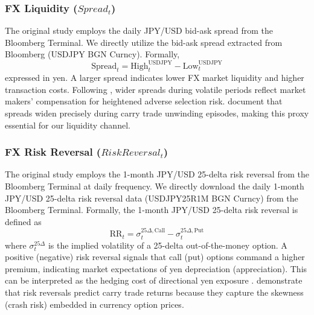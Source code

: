 \documentclass[12pt]{article}
\begin{document}
\subsubsection{FX Liquidity ($Spread_t$)}
{} The original study \parencite{guyot2026risk} employs the daily JPY/USD bid-ask spread from the Bloomberg Terminal. We directly utilize the bid-ask spread extracted from Bloomberg (USDJPY BGN Curncy). Formally, \begin{equation} \text{Spread}_t = \text{High}_t^{\text{USDJPY}} - \text{Low}_t^{\text{USDJPY}} \end{equation} expressed in yen. A larger spread indicates lower FX market liquidity and higher transaction costs. Following \textcite{bollerslev1994bid}, wider spreads during volatile periods reflect market makers' compensation for heightened adverse selection risk. \textcite{gagnon2007carry} document that spreads widen precisely during carry trade unwinding episodes, making this proxy essential for our liquidity channel.

\subsubsection{FX Risk Reversal ($RiskReversal_t$)}
{} The original study \parencite{guyot2026risk} employs the 1-month JPY/USD 25-delta risk reversal from the Bloomberg Terminal at daily frequency. We directly download the daily 1-month JPY/USD 25-delta risk reversal data (USDJPY25R1M BGN Curncy) from the Bloomberg Terminal. Formally, the 1-month JPY/USD 25-delta risk reversal is defined as \begin{equation} \text{RR}_t = \sigma_{t}^{25\Delta, \text{Call}} - \sigma_{t}^{25\Delta, \text{Put}} \end{equation} where $\sigma_{t}^{25\Delta}$ is the implied volatility of a 25-delta out-of-the-money option. A positive (negative) risk reversal signals that call (put) options command a higher premium, indicating market expectations of yen depreciation (appreciation). This can be interpreted as the hedging cost of directional yen exposure \parencite{guyot2026risk}. \textcite{brunnermeier2009carry} demonstrate that risk reversals predict carry trade returns because they capture the skewness (crash risk) embedded in currency option prices.
\end{document}

